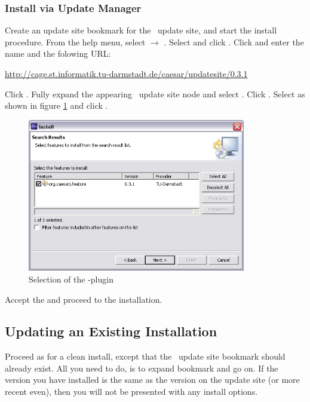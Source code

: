 \subsubsection{Install via Update Manager} 
Create an update site bookmark for the \cjdt ~update site, and start the install procedure.
From the help menu, select  $\rightarrow$ . Select  and click .
Click  and enter the name  and the folowing URL:  
\begin{center}
\href{http://cage.st.informatik.tu-darmstadt.de/caesar/updatesite/0.3.1}{http://cage.st.informatik.tu-darmstadt.de/caesar/updatesite/0.3.1}
\end{center}
Click .
Fully expand the appearing \cjdt ~update site node and select \markedtext{\caesarj}. Click
. Select  as shown in figure \ref{fig:installpage30} and click .\\

\begin{figure}[htbp]
	\centering
		\includegraphics[width=0.85\textwidth]{./images/install_page_3_0.png}
	\caption{Selection of the \caesarj -plugin}
	\label{fig:installpage30}
\end{figure}

Accept the  and proceed to the installation.

\subsection{Updating an Existing Installation}
Proceed as for a clean install, except that the \cjdt ~update site bookmark should already
exist. All you need to do, is to expand bookmark and go on. If the version you have
installed is the same as the version on the update site (or more recent even),
then you will not be presented with any install options.

